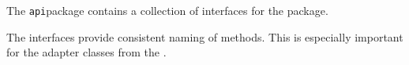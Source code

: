 The \texttt{api}package contains a collection of interfaces for the \texttt{}package.

The interfaces provide consistent naming of methods. This is especially important for the adapter classes from the
\texttt{}.

